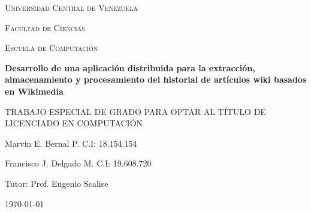 \begin{titlepage}
	\centering
	{\scshape\LARGE Universidad Central de Venezuela\par}
	{\scshape\LARGE Facultad de Ciencias\par}
	{\scshape\LARGE Escuela de Computación\par}


	\vspace*{\fill}
	{\huge\bfseries Desarrollo de una aplicación distribuida para la extracción, almacenamiento y procesamiento del historial de artículos wiki basados en Wikimedia\par}
	\vspace{2cm}
	{\large TRABAJO ESPECIAL DE GRADO PARA OPTAR AL TÍTULO DE LICENCIADO EN COMPUTACIÓN\par}
	\vspace*{\fill}

	{\large Marvin E. Bernal P. C.I: 18.154.154\par}
	{\large Francisco J. Delgado M. C.I: 19.608.720\par}
	{\large Tutor: Prof. Eugenio Scalise\par}
	\vspace{1cm}
	{\large \monthyeardate\today \par}
\end{titlepage}
